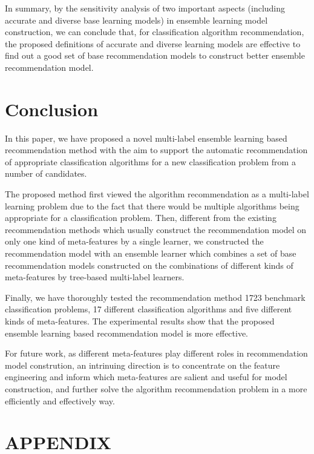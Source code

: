 \documentclass[prodmode,acmtkdd]{acmsmall}
\begin{document}
In summary, by the sensitivity analysis of two important aspects
(including accurate and diverse base learning models) in ensemble
learning model construction, we can conclude that, for
classification algorithm recommendation, the proposed definitions of
accurate and diverse learning models are effective to find out a
good set of base recommendation models to construct better ensemble
recommendation model.


\section{Conclusion}\label{sec:conclusion}

In this paper, we have proposed a novel multi-label ensemble
learning based recommendation method with the aim to support the
automatic recommendation of appropriate classification algorithms
for a new classification problem from a number of candidates.

The proposed method first viewed the algorithm recommendation as a
multi-label learning problem due to the fact that there would be
multiple algorithms being appropriate for a classification problem.
Then, different from the existing recommendation methods which
usually construct the recommendation model on only one kind of
meta-features by a single learner, we constructed the recommendation
model with an ensemble learner which combines a set of base
recommendation models constructed on the combinations of different
kinds of meta-features by tree-based multi-label learners.

Finally, we have thoroughly tested the recommendation method 1723
benchmark classification problems, 17 different classification
algorithms and five different kinds of meta-features. The
experimental results show that the proposed ensemble learning based
recommendation model is more effective.

For future work, as different meta-features play different roles in recommendation model constrution, an intrinuing direction is to concentrate on the feature engineering and inform which meta-features are salient and useful for model construction, and further solve the algorithm recommendation problem in a more efficiently and effectively way.



\appendix\section*{APPENDIX}\setcounter{section}{0}
\end{document}
